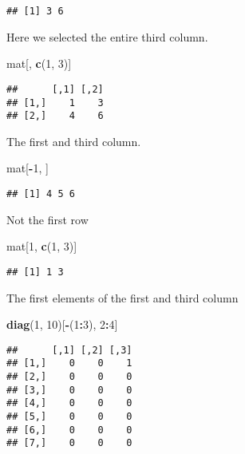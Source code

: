 \documentclass[]{article}
\newenvironment{Shaded}{\begin{snugshade}}{\end{snugshade}}
\newcommand{\KeywordTok}[1]{\textcolor[rgb]{0.13,0.29,0.53}{\textbf{#1}}}
\newcommand{\DecValTok}[1]{\textcolor[rgb]{0.00,0.00,0.81}{#1}}
\newcommand{\OperatorTok}[1]{\textcolor[rgb]{0.81,0.36,0.00}{\textbf{#1}}}
\newcommand{\NormalTok}[1]{#1}
\begin{document}
\begin{verbatim}
## [1] 3 6
\end{verbatim}

Here we selected the entire third column.

\begin{Shaded}
\begin{Highlighting}[]
\NormalTok{mat[, }\KeywordTok{c}\NormalTok{(}\DecValTok{1}\NormalTok{, }\DecValTok{3}\NormalTok{)]}
\end{Highlighting}
\end{Shaded}

\begin{verbatim}
##      [,1] [,2]
## [1,]    1    3
## [2,]    4    6
\end{verbatim}

The first and third column.

\begin{Shaded}
\begin{Highlighting}[]
\NormalTok{mat[}\OperatorTok{-}\DecValTok{1}\NormalTok{, ]}
\end{Highlighting}
\end{Shaded}

\begin{verbatim}
## [1] 4 5 6
\end{verbatim}

Not the first row

\begin{Shaded}
\begin{Highlighting}[]
\NormalTok{mat[}\DecValTok{1}\NormalTok{, }\KeywordTok{c}\NormalTok{(}\DecValTok{1}\NormalTok{, }\DecValTok{3}\NormalTok{)]}
\end{Highlighting}
\end{Shaded}

\begin{verbatim}
## [1] 1 3
\end{verbatim}

The first elements of the first and third column

\begin{Shaded}
\begin{Highlighting}[]
\KeywordTok{diag}\NormalTok{(}\DecValTok{1}\NormalTok{, }\DecValTok{10}\NormalTok{)[}\OperatorTok{-}\NormalTok{(}\DecValTok{1}\OperatorTok{:}\DecValTok{3}\NormalTok{), }\DecValTok{2}\OperatorTok{:}\DecValTok{4}\NormalTok{]}
\end{Highlighting}
\end{Shaded}

\begin{verbatim}
##      [,1] [,2] [,3]
## [1,]    0    0    1
## [2,]    0    0    0
## [3,]    0    0    0
## [4,]    0    0    0
## [5,]    0    0    0
## [6,]    0    0    0
## [7,]    0    0    0
\end{verbatim}
\end{document}
